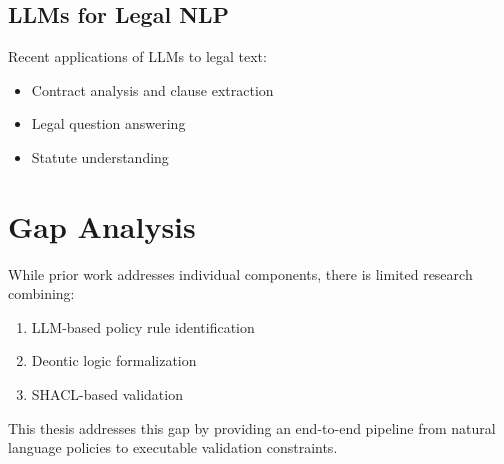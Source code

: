 \subsection{LLMs for Legal NLP}

Recent applications of LLMs to legal text:

\begin{itemize}
    \item Contract analysis and clause extraction \cite{hendrycks2021cuad}
    \item Legal question answering \cite{zhong2020nlpcc}
    \item Statute understanding \cite{niklaus2021lextreme}
\end{itemize}

\section{Gap Analysis}

While prior work addresses individual components, there is limited research combining:

\begin{enumerate}
    \item LLM-based policy rule identification
    \item Deontic logic formalization
    \item SHACL-based validation
\end{enumerate}

This thesis addresses this gap by providing an end-to-end pipeline from natural language policies to executable validation constraints.
